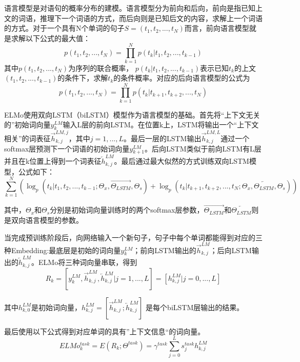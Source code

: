 语言模型是对语句的概率分布的建模。语言模型分为前向和后向，前向是指已知上文的词语，推理下一个词语的方式，而后向则是已知后文的内容，求解上一个词语的方式。对于一个具有N个单词的句子$S=(t_1, t_2, ..., t_N)$而言，前向语言模型就是求解以下公式的最大值：
\begin{equation}
p(t_1, t_2, ..., t_N)=\prod_{k=1}^N p(t_k|t_1,t_2,...,t_{k-1})
\end{equation}
其中$p(t_1, t_2, ..., t_N)$为序列的联合概率，
$p(t_k|t_1, t_2,..., t_{k-1})$表示已知$t_k$的上文$(t_1, t_2, ..., t_{k-1})$的条件下，求解$t_k$的条件概率。对应的后向语言模型的公式为
\begin{equation}
p(t_1, t_2, ..., t_N)=\prod_{k=1}^N p(t_k|t_{k+1},t_{k+2},...,t_N)
\end{equation}

ELMo使用双向LSTM（biLSTM）模型作为语言模型的基础。首先将“上下文无关的”初始词向量$y{_k^{LM}}$输入L层的前向LSTM。在位置k上，LSTM将输出一个“上下文相关”的词表征$\vec{h}_{k,j}^{LM,j}$，其中$j = 1, ..., L$。最后一层的LSTM输出$\vec{h}_{k,j}^{LM,L}$通过一个softmax层预测下一个词语的初始词向量$y{_{k+1}^{LM}}$。后向LSTM类似于前向LSTM有L层并且在k位置上得到一个词表征$\overleftarrow{h}_{k,j}^{LM}$。最后通过最大似然的方式训练双向LSTM模型，公式如下：
\begin{equation}
\sum_{k=1}^N(\log_p(t_k|t_1, t_2,..., t_{k-1};\Theta_x,\overrightarrow{\Theta_{LSTM}},\Theta_s) + \log_p(t_k|t_{k+1},t_{k+2},...,t_N;\Theta_x,\overleftarrow{\Theta_{LSTM}},\Theta_s)
)
\end{equation}

其中，$\Theta_x$和$\Theta_s$分别是初始词向量训练时的两个softmax层参数，$\overrightarrow{\Theta_{LSTM}}$和$\overleftarrow{\Theta_{LSTM}}$则是双向语言模型的参数。

当完成预训练阶段后，向网络输入一个新句子，句子中每个单词都能得到对应的三种Embedding:最底层是初始的词向量$y{_k^{LM}}$；前向LSTM输出的$\overrightarrow{h}_{k,j}^{LM}$；后向LSTM输出的$\overleftarrow{h}_{k,j}^{LM}$。ELMo将三种词向量串联，得到
\begin{equation}
R_k = 
[y_k^{LM}, \overrightarrow{h}_{k,j}^{LM}, \overleftarrow{h}_{k,j}^{LM} | j = 1, ..., L]
= [h_{k,j}^{LM} | j = 0, ..., L]
\end{equation}

其中$h_{k,0}^{LM}$是初始词向量，$h_{k,j}^{LM} = [\overrightarrow{h}_{k,j}^{LM}; \overleftarrow{h}_{k,j}^{LM}]$ 是每个biLSTM层输出的结果。

最后使用以下公式得到对应单词的具有”上下文信息“的词向量。
\begin{equation}
ELMo_k^{task} = E(R_k; \Theta^{task}) = \gamma^{task}\sum_{j=0}^L s_j^{task} h_{k,j}^{LM}
\end{equation}

